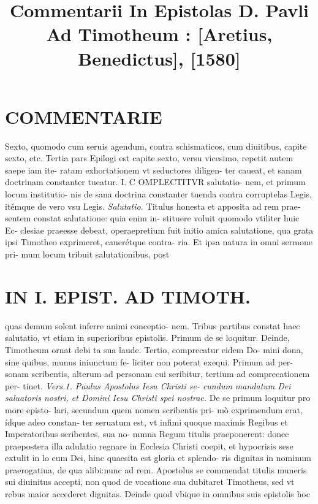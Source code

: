 \documentclass{article}
\begin{document}
\date{}
        \title{Commentarii In Epistolas D. Pavli Ad Timotheum : [Aretius, Benedictus], [1580]}
\maketitle

\begin{pages} 
\beginnumbering
        
\marginpar{[ p.8 ]}
\section*{COMMENTARIE }\pstart Sexto, quomodo cum seruis agendum, contra schismaticos, cum diuitibus, capite sexto, etc.  \pend\pstart Tertia pars Epilogi est capite sexto, versu vicesimo, repetit autem saepe iam ite- ratam exhortationem vt seductores diligen- ter caueat, et sanam doctrinam constanter tueatur.  \pendCAPVT I. \pstart C OMPLECTITVR salutatio- nem, et primum locum institutio- nis de sana doctrina constanter tuenda contra corruptelas Legis, itémque de vero vsu Legis.  \pend
\textit{Salutatio. }\pstart Titulus honesta et apposita ad rem prae- sentem constat salutatione: quia enim in- stituere voluit quomodo vtiliter huic Ec- clesiae praeesse debeat, operaepretium fuit initio amica salutatione, qua grata ipsi Timotheo exprimeret, cauerétque contra- ria. Et ipsa natura in omni sermone pri- mum locum tribuit salutationibus, post  \pend
\textbf{}
\section*{IN I. EPIST. AD TIMOTH. }
\marginpar{[ p.9 ]}\pstart quas demum solent inferre animi conceptio- nem.  \pend\pstart Tribus partibus constat haec salutatio, vt etiam in superioribus epistolis. Primum de se loquitur. Deinde, Timotheum ornat debi ta sua laude. Tertio, comprecatur eidem Do- mini dona, sine quibus, munus iniunctum fe- liciter non poterat exequi. Primum ad per- sonam scribentis, alterum ad personam cui seribitur, tertium ad comprecationem per- tinet.  \pend
\textit{Vers.1. Paulus Apostolus Iesu Christi se- cundum mandatum Dei saluatoris nostri, et Domini Iesu Christi spei nostrae. }\pstart De se primum loquitur pro more episto- lari, secundum quem nomen scribentis pri- mò exprimendum erat, ídque adeo constan- ter seruatum est, vt infimi quoque maximis Regibus et Imperatoribus scribentes, sua no- mmna Regum titulis praeponerent: donec praepostera illa adulatio regnare in Ecclesia Christi coepit, et hypocrisis sese extulit in lo cum Dei, hinc quaesita est gloria et splendo- ris dignitas in nominum praerogatiua, de qua alibi:nunc ad rem. Apostolus se commendat titulis muneris sui diuinitus accepti, non quod de vocatione sua dubitaret Timotheus, sed vt rebus maior accederet dignitas. Deinde quod vbique in omnibus suis epistolis hoc  \pend
\marginpar{[ p.10 ]}

\end{pages}
\end{document}

